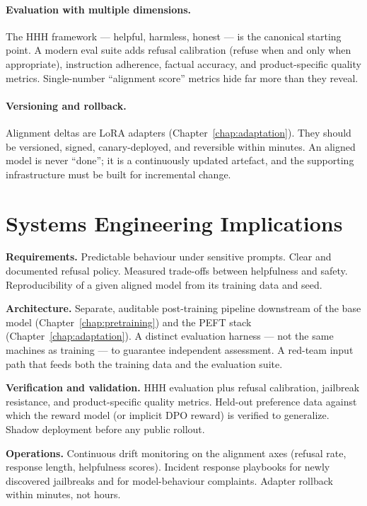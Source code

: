 \paragraph{Evaluation with multiple dimensions.}
The HHH framework --- helpful, harmless, honest
\citep{askell2021general} --- is the canonical starting point. A
modern eval suite adds refusal calibration (refuse when and only
when appropriate), instruction adherence, factual accuracy, and
product-specific quality metrics. Single-number ``alignment score''
metrics hide far more than they reveal.

\paragraph{Versioning and rollback.}
Alignment deltas are LoRA adapters (Chapter~\ref{chap:adaptation}). They should be
versioned, signed, canary-deployed, and reversible within minutes.
An aligned model is never ``done''; it is a continuously updated
artefact, and the supporting infrastructure must be built for
incremental change.

\section{Systems Engineering Implications}

\textbf{Requirements.}
Predictable behaviour under sensitive prompts. Clear and documented
refusal policy. Measured trade-offs between helpfulness and
safety. Reproducibility of a given aligned model from its training
data and seed.

\textbf{Architecture.}
Separate, auditable post-training pipeline downstream of the base
model (Chapter~\ref{chap:pretraining}) and the PEFT stack (Chapter~\ref{chap:adaptation}). A distinct evaluation
harness --- not the same machines as training --- to guarantee
independent assessment. A red-team input path that feeds both the
training data and the evaluation suite.

\textbf{Verification and validation.}
HHH evaluation plus refusal calibration, jailbreak resistance, and
product-specific quality metrics. Held-out preference data against
which the reward model (or implicit DPO reward) is verified to
generalize. Shadow deployment before any public rollout.

\textbf{Operations.}
Continuous drift monitoring on the alignment axes (refusal rate,
response length, helpfulness scores). Incident response playbooks
for newly discovered jailbreaks and for model-behaviour complaints.
Adapter rollback within minutes, not hours.

